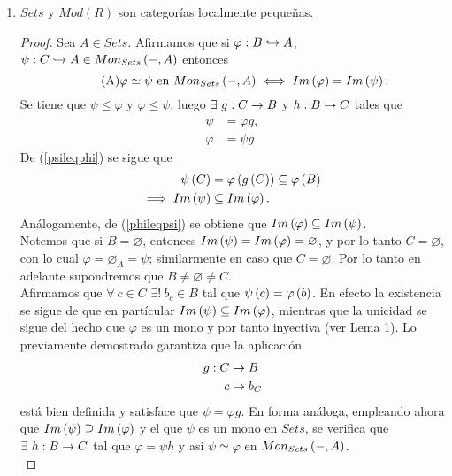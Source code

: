 \documentclass{article}
\begin{document}
\begin{enumerate}[label=\textbf{Ej \arabic*.}]
\begin{proof}
			Por lo tanto $g'$ es un morfismo de $R$-módulos y $g'\pi(x)=g'([x])=g(x)$ por lo que $g'\pi=g$ y así $\pi$ es Cokernel.\\
		\end{proof}
		\item $Sets$ y $Mod(R)$ son categorías localmente pequeñas.
		\begin{proof}
			Sea $A\in Sets$. Afirmamos que si $\catarrow{\varphi}{B}{A}{m}$, $\catarrow{\psi}{C}{A}{m}\in\moncategory{Sets}{A}$ entonces
			\begin{equation*}\tag{A}\label{clasesIm}
				\varphi\simeq\psi \text{ en }Mon_{Sets}\left(-,A\right)\iff Im\left(\varphi\right)=Im\left(\psi\right).
			\end{equation*}
			\boxed{\implies} Se tiene que $\psi\leq\varphi$ y $\varphi\leq \psi$, luego $\exists\ \catarrow{g}{C}{B}{}$ y $\catarrow{h}{B}{C}{}$ tales que \begin{align*}
				\psi&=\varphi g,\tag{*}\label{psileqphi}\\
				\varphi&=\psi g\tag{**}\label{phileqpsi}
			\end{align*}
			De (\ref{psileqphi}) se sigue que
			\begin{align*}
				\psi\left(C\right)&=\varphi\left(g\left(C\right)\right)\subseteq\varphi\left(B\right)\\
				\implies Im\left(\psi\right)&\subseteq Im\left(\varphi\right).
			\end{align*}
			Análogamente, de (\ref{phileqpsi}) se obtiene que $Im\left(\varphi\right)\subseteq Im\left(\psi\right)$.\\
			\boxed{\impliedby} Notemos que si $B=\varnothing$, entonces
			$Im\left(\psi\right)=Im\left(\varphi\right)=\varnothing$, y por lo tanto $C=\varnothing$, con lo cual $\varphi=\varnothing_{A}=\psi$; similarmente en caso que $C=\varnothing$. Por lo tanto en adelante supondremos que $B\neq\varnothing\neq C$. \\
			Afirmamos que $\forall \ c\in C$ $\exists !\ b_c\in B$ tal que $\psi\left(c\right)=\varphi\left(b\right)$. En efecto la existencia se sigue de que en partícular $Im\left(\psi\right)\subseteq Im\left(\varphi\right)$, mientras que la unicidad se sigue del hecho que $\varphi$ es un mono y por tanto inyectiva (ver Lema 1). Lo previamente demostrado garantiza que la aplicación
			\begin{align*}
				g: C &\rightarrow B\\ c &\mapsto b_C
			\end{align*}
			está bien definida y satisface que $\psi=\varphi g$. En forma análoga, empleando ahora que $Im\left(\psi\right)\supseteq Im\left(\varphi\right)$ y el que $\psi$ es un mono en $Sets$, se verifica que $\exists\ \catarrow{h}{B}{C}{}$ tal que $\varphi=\psi h$ y así $\psi\simeq\varphi$ en $Mon_{Sets}\left(-,A\right)$.\\
			

\end{proof}
\end{enumerate}
\end{document}
